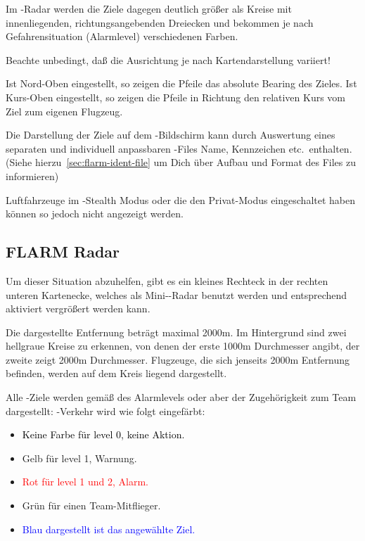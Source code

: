 Im \fl-Radar werden die Ziele dagegen deutlich größer als Kreise mit innenliegenden,
richtungsangebenden Dreiecken  und bekommen je nach Gefahrensituation (Alarmlevel)
verschiedenen Farben.

\achtung Beachte unbedingt, daß die Ausrichtung je nach Kartendarstellung variiert!

Ist Nord-Oben eingestellt, so zeigen die Pfeile das absolute Bearing des Zieles.
Ist Kurs-Oben eingestellt, so zeigen die Pfeile in Richtung den relativen Kurs vom Ziel
zum eigenen Flugzeug.

Die Darstellung der Ziele auf dem \fl-Bildschirm kann durch Auswertung eines separaten
und individuell anpassbaren  \fl-Files Name, Kennzeichen etc.\ enthalten.
(Siehe hierzu~\ref{sec:flarm-ident-file} um Dich über Aufbau und Format des Files zu informieren)

Luftfahrzeuge im \fl-Stealth Modus oder die den Privat-Modus eingeschaltet haben können so jedoch nicht angezeigt werden.


\subsection*{FLARM Radar}
Um dieser Situation abzuhelfen, gibt es ein kleines Rechteck in der rechten unteren Kartenecke,
welches als Mini-\fl-Radar benutzt werden und entsprechend aktiviert vergrößert werden kann.

Die dargestellte Entfernung beträgt maximal 2000m. Im Hintergrund sind zwei hellgraue Kreise zu erkennen,
von denen der erste 1000m Durchmesser angibt, der zweite zeigt 2000m Durchmesser.
Flugzeuge, die sich jenseits 2000m Entfernung befinden, werden auf dem Kreis liegend dargestellt.


Alle \fl-Ziele werden gemäß des Alarmlevels  oder aber der Zugehörigkeit zum Team dargestellt:
\fl-Verkehr wird wie folgt eingefärbt:
\begin{itemize}
\item \textcolor{black} {Keine Farbe für level 0, keine Aktion.}
\item \textcolor{warning} { Gelb für level 1, Warnung.}
\item \textcolor{red} {Rot für level 1 und 2, Alarm.}
\item \textcolor{teammate} {Grün für einen Team-Mitflieger.}
\item \textcolor{blue} {Blau dargestellt ist das angewählte Ziel.}
\end{itemize}


